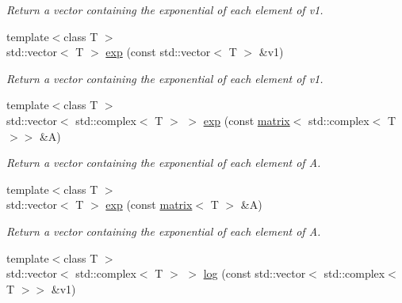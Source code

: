 \begin{DoxyCompactItemize}
\begin{DoxyCompactList}\small\item\em Return a vector containing the exponential of each element of v1. \end{DoxyCompactList}\item 
\hypertarget{namespacekeycpp_a66a68550626786b480e7c8d02aaf9039}{{\footnotesize template$<$class T $>$ }\\std\-::vector$<$ T $>$ \hyperlink{namespacekeycpp_a66a68550626786b480e7c8d02aaf9039}{exp} (const std\-::vector$<$ T $>$ \&v1)}\label{namespacekeycpp_a66a68550626786b480e7c8d02aaf9039}

\begin{DoxyCompactList}\small\item\em Return a vector containing the exponential of each element of v1. \end{DoxyCompactList}\item 
\hypertarget{namespacekeycpp_a6a8bd2143a6d613b560f71d0b99b346f}{{\footnotesize template$<$class T $>$ }\\std\-::vector$<$ std\-::complex$<$ T $>$ $>$ \hyperlink{namespacekeycpp_a6a8bd2143a6d613b560f71d0b99b346f}{exp} (const \hyperlink{classkeycpp_1_1matrix}{matrix}$<$ std\-::complex$<$ T $>$$>$ \&A)}\label{namespacekeycpp_a6a8bd2143a6d613b560f71d0b99b346f}

\begin{DoxyCompactList}\small\item\em Return a vector containing the exponential of each element of A. \end{DoxyCompactList}\item 
\hypertarget{namespacekeycpp_a6cc8180fd2f17512f0f75957615da294}{{\footnotesize template$<$class T $>$ }\\std\-::vector$<$ T $>$ \hyperlink{namespacekeycpp_a6cc8180fd2f17512f0f75957615da294}{exp} (const \hyperlink{classkeycpp_1_1matrix}{matrix}$<$ T $>$ \&A)}\label{namespacekeycpp_a6cc8180fd2f17512f0f75957615da294}

\begin{DoxyCompactList}\small\item\em Return a vector containing the exponential of each element of A. \end{DoxyCompactList}\item 
\hypertarget{namespacekeycpp_a95843ef0a09d799d8b62eb7b91e9c02f}{{\footnotesize template$<$class T $>$ }\\std\-::vector$<$ std\-::complex$<$ T $>$ $>$ \hyperlink{namespacekeycpp_a95843ef0a09d799d8b62eb7b91e9c02f}{log} (const std\-::vector$<$ std\-::complex$<$ T $>$$>$ \&v1)}\label{namespacekeycpp_a95843ef0a09d799d8b62eb7b91e9c02f}


\end{DoxyCompactItemize}
